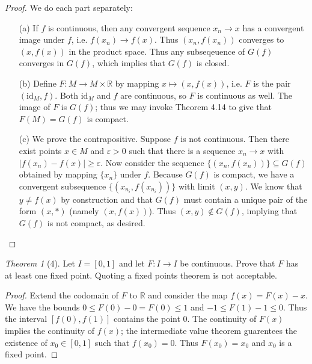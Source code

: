 \documentclass[12pt]{article}
\theoremstyle{remark}
\theoremstyle{named}
\newtheorem*{theorem}{Theorem}
\newcommand{\e}{\varepsilon}
\newcommand{\R}{\mathbb R}
\newcommand{\id}[1]{\text{id}_{#1}}
\begin{document}
\begin{proof}
    We do each part separately:
    \begin{enumerate}
        \item[(a)] If \(f\) is continuous, then any convergent sequence \(x_n \to x\) has a convergent image under \(f\), i.e. \(f(x_n) \to f(x)\). Thus \((x_n, f(x_n))\) converges to \((x, f(x))\) in the product space. Thus any subseqeuence of \(G(f)\) converges in \(G(f)\), which implies that \(G(f)\) is closed.
        \item[(b)] Define \(F : M \to M \times \R\) by mapping \(x \mapsto (x, f(x))\), i.e. \(F\) is the pair \((\id{M}, f)\). Both \(\id{M}\) and \(f\) are continuous, so \(F\) is continuous as well. The image of \(F\) is \(G(f)\); thus we may invoke Theorem 4.14 to give that \(F(M) = G(f)\) is compact.
        \item[(c)] We prove the contrapositive. Suppose \(f\) is not continuous. Then there exist points \(x \in M\) and \(\e > 0\) such that there is a sequence \(x_n \to x\) with \(|f(x_n) - f(x)| \ge \e\). Now consider the sequence \(\{(x_n, f(x_n))\} \subseteq G(f)\) obtained by mapping \(\{x_n\}\) under \(f\). Because \(G(f)\) is compact, we have a convergent subsequence \(\{(x_{n_i}, f(x_{n_i}))\}\) with limit \((x, y)\). We know that \(y \neq f(x)\) by construction and that \(G(f)\) must contain a unique pair of the form \((x, *)\) (namely \((x, f(x))\)). Thus \((x, y) \notin G(f)\), implying that \(G(f)\) is not compact, as desired.
    \end{enumerate}    
\end{proof}

\begin{theorem}[4]
    Let \(I = [0, 1]\) and let \(F : I \to I\) be continuous. Prove that \(F\) has at least one fixed point. Quoting a fixed points theorem is not acceptable.
\end{theorem}

\begin{proof}
    Extend the codomain of \(F\) to \(\R\) and consider the map \(f(x) = F(x) - x\). We have the bounds \(0 \le F(0) - 0 = F(0) \le 1\) and \(-1 \le F(1) - 1 \le 0\). Thus the interval \([f(0), f(1)]\) contains the point \(0\). The continuity of \(F(x)\) implies the continuity of \(f(x)\); the intermediate value theorem guarentees the existence of \(x_0 \in [0, 1]\) such that \(f(x_0) = 0\). Thus \(F(x_0) = x_0\) and \(x_0\) is a fixed point. 
\end{proof}
\end{document}
